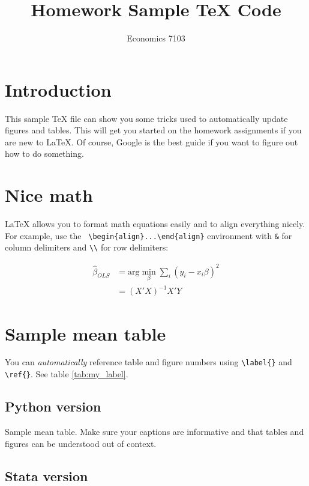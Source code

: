 \documentclass{article}
\title{Homework Sample TeX Code}
\author{Economics 7103}
\date{}
\begin{document}
  
\maketitle

\section{Introduction}

This sample TeX file can show you some tricks used to automatically update figures and tables.  This will get you started on the homework assignments if you are new to LaTeX.  Of course, Google is the best guide if you want to figure out how to do something.

\section{Nice math}
LaTeX allows you to format math equations easily and to align everything nicely.  For example, use the \verb! \begin{align}...\end{align}! environment with \verb!&! for column delimiters and \verb!\\! for row delimiters:

\begin{align}
    \hat{\beta}_{OLS} &= \text{arg}\min_{\beta} \sum_{i} (y_i - x_i \beta)^2 \\
    &= (X'X)^{-1}X'Y \label{eq:betahat}
\end{align}

\section{Sample mean table}
You can \textit{automatically} reference table and figure numbers using \verb!\label{}! and \verb!\ref{}!. See table \ref{tab:my_label}.


\subsection{Python version}

\begin{table}[ht]
    \centering
    
    \caption{Sample mean table.  Make sure your captions are informative and that tables and figures can be understood out of context.}
    \label{tab:my_label}
\end{table}

\subsection{Stata version}
\end{document}
